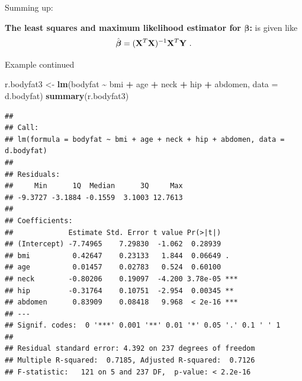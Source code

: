 \documentclass[
  10pt,
  ignorenonframetext,
]{beamer}
\newenvironment{Shaded}{\begin{snugshade}}{\end{snugshade}}
\newcommand{\AttributeTok}[1]{\textcolor[rgb]{0.13,0.29,0.53}{#1}}
\newcommand{\FunctionTok}[1]{\textcolor[rgb]{0.13,0.29,0.53}{\textbf{#1}}}
\newcommand{\NormalTok}[1]{#1}
\newcommand{\OtherTok}[1]{\textcolor[rgb]{0.56,0.35,0.01}{#1}}
\newcommand{\SpecialCharTok}[1]{\textcolor[rgb]{0.81,0.36,0.00}{\textbf{#1}}}
\begin{document}
\begin{frame}
Summing up:

\textbf{The least squares and maximum likelihood estimator for ${\boldsymbol \beta}$:}
is given like
\[ \hat{\boldsymbol\beta}=({\bf X}^T{\bf X})^{-1} {\bf X}^T {\bf Y} \ .\]
\end{frame}

\begin{frame}[fragile]
\begin{block}{Example continued}
\protect\hypertarget{example-continued}{}
\vspace{5mm}

\tiny

\begin{Shaded}
\begin{Highlighting}[]
\NormalTok{r.bodyfat3 }\OtherTok{\textless{}{-}} \FunctionTok{lm}\NormalTok{(bodyfat }\SpecialCharTok{\textasciitilde{}}\NormalTok{ bmi }\SpecialCharTok{+}\NormalTok{ age }\SpecialCharTok{+}\NormalTok{ neck }\SpecialCharTok{+}\NormalTok{ hip }\SpecialCharTok{+}\NormalTok{ abdomen, }\AttributeTok{data =}\NormalTok{ d.bodyfat)}
\FunctionTok{summary}\NormalTok{(r.bodyfat3)}
\end{Highlighting}
\end{Shaded}

\begin{verbatim}
## 
## Call:
## lm(formula = bodyfat ~ bmi + age + neck + hip + abdomen, data = d.bodyfat)
## 
## Residuals:
##     Min      1Q  Median      3Q     Max 
## -9.3727 -3.1884 -0.1559  3.1003 12.7613 
## 
## Coefficients:
##             Estimate Std. Error t value Pr(>|t|)    
## (Intercept) -7.74965    7.29830  -1.062  0.28939    
## bmi          0.42647    0.23133   1.844  0.06649 .  
## age          0.01457    0.02783   0.524  0.60100    
## neck        -0.80206    0.19097  -4.200 3.78e-05 ***
## hip         -0.31764    0.10751  -2.954  0.00345 ** 
## abdomen      0.83909    0.08418   9.968  < 2e-16 ***
## ---
## Signif. codes:  0 '***' 0.001 '**' 0.01 '*' 0.05 '.' 0.1 ' ' 1
## 
## Residual standard error: 4.392 on 237 degrees of freedom
## Multiple R-squared:  0.7185, Adjusted R-squared:  0.7126 
## F-statistic:   121 on 5 and 237 DF,  p-value: < 2.2e-16
\end{verbatim}

\normalsize
\end{block}
\end{frame}
\end{document}

